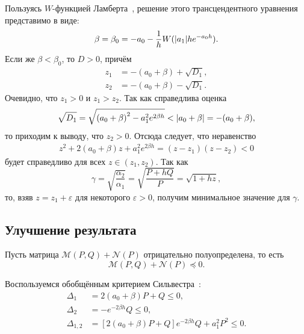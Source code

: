 \documentclass[a4paper,14pt]{article}
\begin{document}
Пользуясь $W$-функцией Ламберта~\cite{corless1996}, решение этого
трансцендентного уравнения представимо в виде:
\begin{equation*}
  \beta = \beta_0 = -a_0 - \frac{1}{h} W(\abs{a_1} h e^{-a_0 h}).
\end{equation*}
Если же $\beta < \beta_0$, то $D > 0$, причём
\begin{equation*}
  \begin{aligned}
    z_1 &= -(a_0 + \beta) + \sqrt{D_1}, \\
    z_2 &= -(a_0 + \beta) - \sqrt{D_1}.
  \end{aligned}
\end{equation*}
Очевидно, что $z_1 > 0$ и $z_1 > z_2$. Так как справедлива оценка
\begin{equation*}
  \sqrt{D_1}
  =
  \sqrt{
    {(a_0 + \beta)}^2 - a_1^2 e^{2 \beta h}
  }
  < \abs{a_0 + \beta}
  = -(a_0 + \beta),
\end{equation*}
то приходим к выводу, что $z_2 > 0$. Отсюда следует, что
неравенство
\begin{equation*}
  \begin{aligned}
    z^2 + 2 (a_0 + \beta) z + a_1^2 e^{2 \beta h}
    =
    (z - z_1) (z - z_2) < 0
  \end{aligned}
\end{equation*}
будет справедливо для всех $z \in (z_1, z_2)$. Так как
\begin{equation*}
  \gamma
  = \sqrt{\frac{\alpha_2}{\alpha_1}}
  = \sqrt{\frac{P + h Q}{P}}
  = \sqrt{1 + h z},
\end{equation*}
то, взяв $z = z_1 + \varepsilon$ для некоторого $\varepsilon > 0$, получим
минимальное значение для $\gamma$.

\subsection{Улучшение результата}

Пусть матрица $\mathcal{M}(P, Q) + \mathcal{N}(P)$ отрицательно
полуопределена, то есть
\begin{equation*}
  \mathcal{M}(P, Q) + \mathcal{N}(P) \preceq 0.
\end{equation*}

Воспользуемся обобщённым критерием Сильвестра~\cite[стр.~184]{ilin2014}:
\begin{equation*}
  \begin{aligned}
    \Delta_1
    &=
      2 (a_0 + \beta) P + Q \leqslant 0, \\
    \Delta_2
    &=
      -e^{-2 \beta h} Q \leqslant 0, \\
    \Delta_{1,2}
    &=
      \left[
      2 (a_0 + \beta) P + Q
      \right] e^{-2 \beta h} Q + a_1^2 P^2 \leqslant 0.
  \end{aligned}
\end{equation*}

\newpage

\renewcommand{\refname}{Список использованных источников}
\begin{center}
  \printbibliography{}
\end{center}
\end{document}
